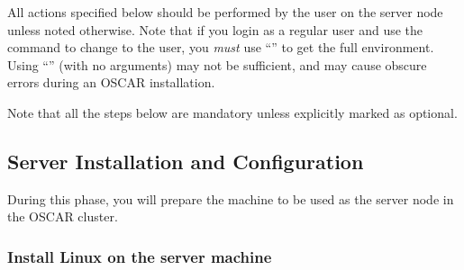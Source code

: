 %
%
%
%
%

\label{sec:detail}

All actions specified below should be performed by the 
user on the server node unless noted otherwise.  Note that if you
login as a regular user and use the  command to change to the
 user, you {\em must} use ``'' to get the full
 environment.  Using ``'' (with no arguments) may
not be sufficient, and may cause obscure errors during an OSCAR
installation.

Note that all the steps below are mandatory unless explicitly marked
as optional.



\subsection{Server Installation and Configuration}
\label{det:serverinstall}

During this phase, you will prepare the machine to be used as the
server node in the OSCAR cluster.


\subsubsection{Install Linux on the server machine}
\label{det:serverosinstall}

